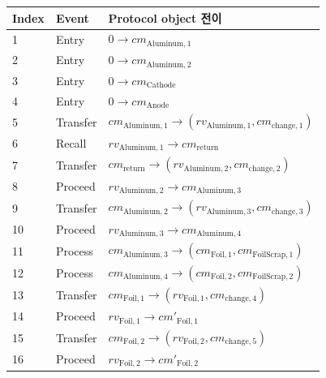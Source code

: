 \documentclass[11pt,a4paper]{extarticle}
\begin{document}
\begin{longtable}{@{}p{}p{}p{}@{}}
  \toprule
  Index & Event    & Protocol object 전이                                                                     \\
  \midrule
  \endhead
  1     & Entry    & $0\rightarrow cm_{\mathrm{Aluminum},1}$                                                \\
  2     & Entry    & $0\rightarrow cm_{\mathrm{Aluminum},2}$                                                \\
  3     & Entry    & $0\rightarrow cm_{\mathrm{Cathode}}$                                                   \\
  4     & Entry    & $0\rightarrow cm_{\mathrm{Anode}}$                                                     \\
  5     & Transfer & $cm_{\mathrm{Aluminum},1}\rightarrow(rv_{\mathrm{Aluminum},1},cm_{\mathrm{change},1})$ \\
  6     & Recall   & $rv_{\mathrm{Aluminum},1}\rightarrow cm_{\mathrm{return}}$                             \\
  7     & Transfer & $cm_{\mathrm{return}}\rightarrow(rv_{\mathrm{Aluminum},2},cm_{\mathrm{change},2})$     \\
  8     & Proceed  & $rv_{\mathrm{Aluminum},2}\rightarrow cm_{\mathrm{Aluminum},3}$                         \\
  9     & Transfer & $cm_{\mathrm{Aluminum},2}\rightarrow(rv_{\mathrm{Aluminum},3},cm_{\mathrm{change},3})$ \\
  10    & Proceed  & $rv_{\mathrm{Aluminum},3}\rightarrow cm_{\mathrm{Aluminum},4}$                         \\
  11    & Process  & $cm_{\mathrm{Aluminum},3}\rightarrow(cm_{\mathrm{Foil},1},cm_{\mathrm{FoilScrap},1})$  \\
  12    & Process  & $cm_{\mathrm{Aluminum},4}\rightarrow(cm_{\mathrm{Foil},2},cm_{\mathrm{FoilScrap},2})$  \\
  13    & Transfer & $cm_{\mathrm{Foil},1}\rightarrow(rv_{\mathrm{Foil},1},cm_{\mathrm{change},4})$         \\
  14    & Proceed  & $rv_{\mathrm{Foil},1}\rightarrow cm'_{\mathrm{Foil},1}$                                \\
  15    & Transfer & $cm_{\mathrm{Foil},2}\rightarrow(rv_{\mathrm{Foil},2},cm_{\mathrm{change},5})$         \\
  16    & Proceed  & $rv_{\mathrm{Foil},2}\rightarrow cm'_{\mathrm{Foil},2}$                                \\

\end{longtable}
\end{document}
